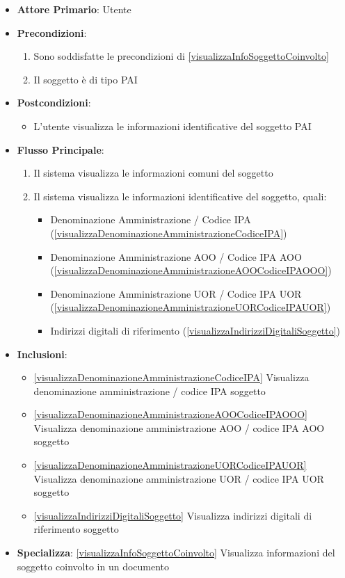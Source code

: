 \begin{itemize}
    \item \textbf{Attore Primario}: Utente

    \item \textbf{Precondizioni}:
    \begin{enumerate}
        \item Sono soddisfatte le precondizioni di \ref{visualizzaInfoSoggettoCoinvolto}
        \item Il soggetto è di tipo PAI
    \end{enumerate}

    \item \textbf{Postcondizioni}:
    \begin{itemize}
        \item L'utente visualizza le informazioni identificative del soggetto PAI
    \end{itemize}

    \item \textbf{Flusso Principale}:
    \begin{enumerate}
        \item Il sistema visualizza le informazioni comuni del soggetto
        \item Il sistema visualizza le informazioni identificative del soggetto, quali:
        \begin{itemize}
            \item Denominazione Amministrazione / Codice IPA (\ref{visualizzaDenominazioneAmministrazioneCodiceIPA})
            \item Denominazione Amministrazione AOO / Codice IPA AOO (\ref{visualizzaDenominazioneAmministrazioneAOOCodiceIPAOOO})
            \item Denominazione Amministrazione UOR / Codice IPA UOR (\ref{visualizzaDenominazioneAmministrazioneUORCodiceIPAUOR})
            \item Indirizzi digitali di riferimento (\ref{visualizzaIndirizziDigitaliSoggetto})
        \end{itemize}
    \end{enumerate}
    \item \textbf{Inclusioni}: 
    \begin{itemize}
        \item \ref{visualizzaDenominazioneAmministrazioneCodiceIPA} Visualizza denominazione amministrazione / codice IPA soggetto
        \item \ref{visualizzaDenominazioneAmministrazioneAOOCodiceIPAOOO} Visualizza denominazione amministrazione AOO / codice IPA AOO soggetto
        \item \ref{visualizzaDenominazioneAmministrazioneUORCodiceIPAUOR} Visualizza denominazione amministrazione UOR / codice IPA UOR soggetto
        \item \ref{visualizzaIndirizziDigitaliSoggetto} Visualizza indirizzi digitali di riferimento soggetto
    \end{itemize}
    \item \textbf{Specializza}: \ref{visualizzaInfoSoggettoCoinvolto} Visualizza informazioni del soggetto coinvolto in un documento
\end{itemize}
